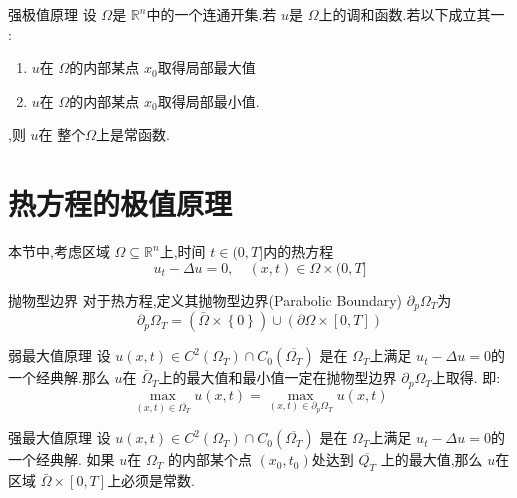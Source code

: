 \documentclass[../../main.tex]{subfiles}
\begin{document}
\begin{theorem}{强极值原理}
    设 \(   \Omega   \)是 \(  \mathbb{R} ^{n}  \)中的一个连通开集.若 \(  u  \)是 \(   \Omega   \)上的调和函数.若以下成立其一 :
    \begin{enumerate}
        \item  \(  u  \)在 \(   \Omega   \)的内部某点 \(  x_0  \)取得局部最大值
        \item \(  u  \)在 \(   \Omega   \)的内部某点 \(  x_0  \)取得局部最小值.   
    \end{enumerate}
    ,则 \(  u  \)在 整个\(   \Omega   \)上是常函数.         
\end{theorem}

\section{热方程的极值原理}
本节中,考虑区域 \(   \Omega \subseteq \mathbb{R} ^{n}  \)上,时间 \(  t\in (0,T]  \)内的热方程 \[
u_{t}- \Delta u= 0,\quad \left( x,t \right)\in  \Omega \times (0,T] 
\]  

\begin{definition}{抛物型边界}
    对于热方程,定义其抛物型边界(Parabolic Boundary) \(   \partial _{p} \Omega _{T}  \)为 \[
     \partial _{p} \Omega _{T}= \left(  \bar{\Omega}\times \left\{ 0 \right\} \right)\cup \left(  \partial  \Omega \times \left[ 0,T \right]  \right)  
    \] 
\end{definition}

\begin{theorem}{弱最大值原理}
    设 \(  u\left( x,t \right)\in C^{2}\left(  \Omega _{T} \right)\cap C_0\left( \overline{ \Omega _{T}} \right)     \) 是在 \(   \Omega _{T}  \)上满足 \(  u_{t}- \Delta u= 0  \)的一个经典解.那么 \(  u  \)在 \(   \bar{\Omega}_{T}  \)上的最大值和最小值一定在抛物型边界 \(   \partial _{p} \Omega _{T}  \)上取得. 即: \[
    \max _{\left( x,t \right)\in   \bar{\Omega_{T}} }u\left( x,t \right)= \max _{\left( x,t \right)\in  \partial _{p} \Omega _{T} }u\left( x,t \right)  
    \]    
\end{theorem}


\begin{theorem}{强最大值原理}
  设 \(  u\left( x,t \right)\in C^{2}\left(  \Omega _{T} \right)\cap C_0\left( \overline{ \Omega _{T}} \right)     \) 是在 \(   \Omega _{T}  \)上满足 \(  u_{t}- \Delta u= 0  \)的一个经典解. 如果 \(  u  \)在 \(   \Omega _{T}  \) 的内部某个点 \(  \left( x_0,t_0 \right)   \)处达到 \(  \overline{Q_{T}}  \)     上的最大值,那么 \(  u  \)在区域 \(   \bar{\Omega}\times \left[ 0,T \right]   \)上必须是常数.  
\end{theorem}
\end{document}
